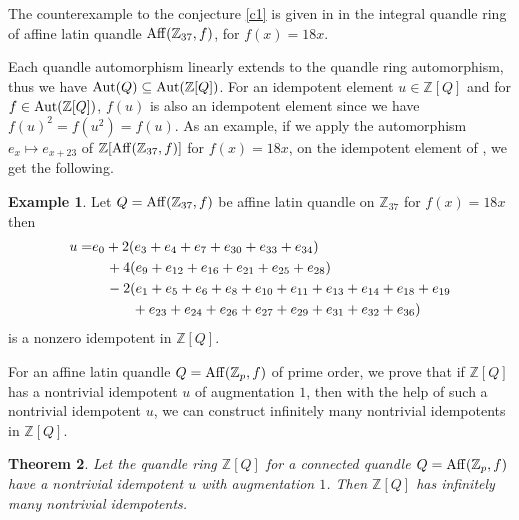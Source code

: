\documentclass[10pt,twoside,reqno]{amsart}
\newtheorem{theorem}{Theorem}[section]
\theoremstyle{definition}
\newtheorem{example}[theorem]{Example}
\numberwithin{equation}{section}
\begin{document}
The counterexample to the conjecture \ref{c1} is given in \cite[Theorem 5.1]{Jab26} in the integral quandle ring of affine latin quandle ${\rm Aff}(\mathbb Z_{37},f)$, for $f(x)=18x$. 

Each quandle automorphism linearly extends to the quandle ring automorphism, thus we have ${\rm Aut}(Q) \subseteq {\rm Aut}(\mathbb Z[Q])$. For an idempotent element $u\in \mathbb Z[Q]$ and for $f\in {\rm Aut}(\mathbb Z[Q])$, $f(u)$ is also an idempotent element since we have $f(u)^2=f(u^2)=f(u)$. As an example, if we apply the automorphism $e_x\mapsto e_{x+23}$ of $\mathbb Z[{\rm Aff}(\mathbb Z_{37},f)]$ for $f(x)=18x$, on the idempotent element of \cite[4,Theorem 5.1]{Jab26}, we get the following. 



\begin{example}\label{eg1}
Let $Q={\rm Aff}(\mathbb Z_{37},f)$ be affine latin quandle on $\mathbb Z_{37}$ for $f(x)=18x$ then \begin{align*}
u=& e_0+2(e_3+e_4+e_7+e_{30}+e_{33}+e_{34})\\
&\hspace{0.35cm}+4(e_9+e_{12}+e_{16}+e_{21}+e_{25}+e_{28})\\
&\hspace{0.35cm}-2(e_1+e_5+e_6+e_8+e_{10}+e_{11}+e_{13}+e_{14}+e_{18}+e_{19}\\
&\hspace{0.995cm}+e_{23}+e_{24}+e_{26}+e_{27}+e_{29}+e_{31}+e_{32}+e_{36})
\end{align*}
is a nonzero idempotent in $\mathbb{Z}[Q]$.
\end{example}



For an affine latin quandle $Q={\rm Aff}(\mathbb Z_p,f)$ of prime order, we prove that if $\mathbb Z[Q]$ has a nontrivial idempotent $u$ of augmentation $1$, then with the help of such a nontrivial idempotent $u$, we can construct infinitely many nontrivial idempotents in $\mathbb Z[Q]$.



\begin{theorem}
Let the quandle ring $\mathbb Z[Q]$ for a connected quandle $Q={\rm Aff}(\mathbb Z_p,f)$ have a nontrivial idempotent $u$ with augmentation $1$. Then $\mathbb Z[Q]$ has infinitely many nontrivial idempotents.
\end{theorem}
\end{document}
